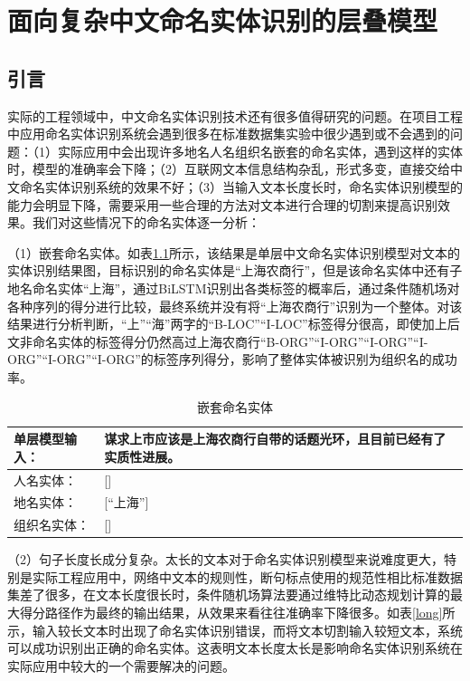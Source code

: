 \documentclass[winfonts,master,oneside,nobackinfo]{njuthesis}
\begin{document}
\chapter{面向复杂中文命名实体识别的层叠模型}

\section{引言}

实际的工程领域中，中文命名实体识别技术还有很多值得研究的问题。在项目工程中应用命名实体识别系统会遇到很多在标准数据集实验中很少遇到或不会遇到的问题：（1）实际应用中会出现许多地名人名组织名嵌套的命名实体，遇到这样的实体时，模型的准确率会下降；（2）互联网文本信息结构杂乱，形式多变，直接交给中文命名实体识别系统的效果不好；（3）当输入文本长度长时，命名实体识别模型的能力会明显下降，需要采用一些合理的方法对文本进行合理的切割来提高识别效果。我们对这些情况下的命名实体逐一分析：

（1）嵌套命名实体。如表\ref{cascade}所示，该结果是单层中文命名实体识别模型对文本的实体识别结果图，目标识别的命名实体是“上海农商行”，但是该命名实体中还有子地名命名实体“上海”，通过BiLSTM识别出各类标签的概率后，通过条件随机场对各种序列的得分进行比较，最终系统并没有将“上海农商行”识别为一个整体。对该结果进行分析判断，“上”“海”两字的“B-LOC”“I-LOC”标签得分很高，即使加上后文非命名实体的标签得分仍然高过上海农商行“B-ORG”“I-ORG”“I-ORG”“I-ORG”“I-ORG”“I-ORG”的标签序列得分，影响了整体实体被识别为组织名的成功率。

\begin{table}[h]
\centering
\begin{tabularx}{0.95\textwidth}{|l|X|}
\hline
单层模型输入： & 谋求上市应该是上海农商行自带的话题光环，且目前已经有了实质性进展。 \\ \hline
人名实体：         & {[}{]}                                                                      \\ \hline
地名实体：         & {[}“上海”{]}                                                                \\ \hline
组织名实体：        & {[}{]}                                                                      \\ \hline
\end{tabularx}
\caption{嵌套命名实体}
\label{cascade}
\end{table}

（2）句子长度长成分复杂。太长的文本对于命名实体识别模型来说难度更大，特别是实际工程应用中，网络中文本的规则性，断句标点使用的规范性相比标准数据集差了很多，在文本长度很长时，条件随机场算法要通过维特比动态规划计算的最大得分路径作为最终的输出结果，从效果来看往往准确率下降很多。如表\ref{long}所示，输入较长文本时出现了命名实体识别错误，而将文本切割输入较短文本，系统可以成功识别出正确的命名实体。这表明文本长度太长是影响命名实体识别系统在实际应用中较大的一个需要解决的问题。
\end{document}
